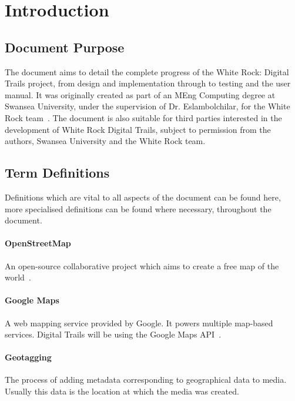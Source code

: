 \documentclass[11pt,a4paper]{report}
\begin{document}


\newpage
\setcounter{secnumdepth}{0}
\setcounter{page}{1}
\tableofcontents

\newpage
\setcounter{page}{1}
\chapter*{Introduction}
\newpage
\label{sec:introduction}

\section{Document Purpose}
The document aims to detail the complete progress of the White Rock: Digital Trails project, from design and implementation through to testing and the user manual. It was originally created as part of an MEng Computing degree at Swansea University, under the supervision of Dr. Eslambolchilar, for the White Rock team~\cite{whiterock}. The document is also suitable for third parties interested in the development of White Rock Digital Trails, subject to permission from the authors, Swansea University and the White Rock team.

\section{Term Definitions}
\label{sec:term-definitions}
Definitions which are vital to all aspects of the document can be found here, more specialised definitions can be found where necessary, throughout the document. 

\subsubsection{OpenStreetMap}
An open-source collaborative project which aims to create a free map of the world~\cite{OSM}.

\subsubsection{Google Maps}
A web mapping service provided by Google. It powers multiple map-based services. Digital Trails will be using the Google Maps API~\cite{googleAPI}.

\subsubsection{Geotagging}
The process of adding metadata corresponding to geographical data to media. Usually this data is the location at which the media was created.
\end{document}
